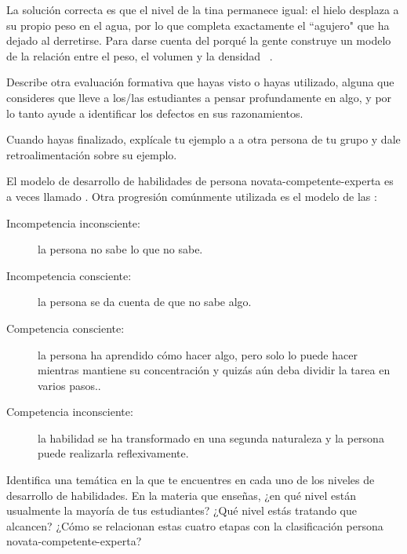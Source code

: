 
La solución correcta es que el nivel de la tina permanece igual:
el hielo desplaza a su propio peso en el agua,
por lo que completa exactamente el ``agujero" que ha dejado al derretirse.
Para darse cuenta del porqué la gente construye un modelo de la relación entre el peso, el volumen y la densidad ~\cite{Epst2002}.

Describe otra evaluación formativa que hayas visto o hayas utilizado,
alguna que consideres que lleve a los/las estudiantes a pensar profundamente en algo,
y por lo tanto ayude a identificar los defectos en sus razonamientos.

Cuando hayas finalizado,
explícale tu ejemplo a a otra persona de tu grupo
y dale retroalimentación sobre su ejemplo.

El modelo de desarrollo de habilidades de persona novata-competente-experta
es a veces llamado
.
Otra progresión comúnmente utilizada es el modelo de las :

\begin{description}

\item[Incompetencia inconsciente:]
  la persona no sabe lo que no sabe.

\item[Incompetencia consciente:]
  la persona se da cuenta de que no sabe algo.

\item[Competencia consciente:]
la persona ha aprendido cómo hacer algo,
pero solo lo puede hacer mientras mantiene su concentración
y quizás aún deba dividir la tarea en varios pasos..

\item[Competencia inconsciente:]
  la habilidad se ha transformado en una segunda naturaleza
y la persona puede realizarla reflexivamente.

\end{description}

Identifica una temática en la que te encuentres en cada uno de los niveles de desarrollo de habilidades.
En la materia que enseñas, ¿en qué nivel están usualmente la mayoría de tus estudiantes?
¿Qué nivel estás tratando que alcancen?
¿Cómo se relacionan estas cuatro etapas con la clasificación persona novata-competente-experta?

